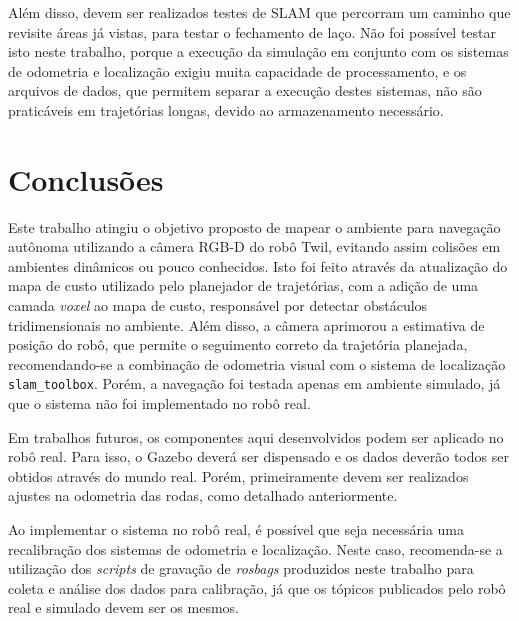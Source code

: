 \documentclass[repeatfields,xlists,xpacks,oneside,yearsonly]{ufrgscca}
\begin{document}
Além disso, devem ser realizados testes de SLAM que percorram um
caminho que revisite áreas já vistas, para testar o fechamento de
laço. Não foi possível testar isto neste trabalho, porque a execução
da simulação em conjunto com os sistemas de odometria e localização
exigiu muita capacidade de processamento, e os arquivos de dados, que
permitem separar a execução destes sistemas, não são praticáveis em
trajetórias longas, devido ao armazenamento necessário.

\chapter{Conclusões}
\label{conclusao}

Este trabalho atingiu o objetivo proposto de mapear o ambiente para
navegação autônoma utilizando a câmera RGB-D do robô Twil, evitando
assim colisões em ambientes dinâmicos ou pouco conhecidos. Isto foi
feito através da atualização do mapa de custo utilizado pelo
planejador de trajetórias, com a adição de uma camada \textit{voxel}
ao mapa de custo, responsável por detectar obstáculos tridimensionais
no ambiente. Além disso, a câmera aprimorou a estimativa de posição
do robô, que permite o seguimento correto da trajetória planejada,
recomendando-se a combinação de odometria visual com o sistema de
localização \texttt{slam\_toolbox}. Porém, a navegação foi testada
apenas em ambiente simulado, já que o sistema não foi implementado no
robô real.

Em trabalhos futuros, os componentes aqui desenvolvidos podem ser
aplicado no robô real. Para isso, o Gazebo deverá ser dispensado e os
dados deverão todos ser obtidos através do mundo real. Porém,
primeiramente devem ser realizados ajustes na odometria das rodas,
como detalhado anteriormente.

Ao implementar o sistema no robô real, é possível que seja necessária
uma recalibração dos sistemas de odometria e localização. Neste caso,
recomenda-se a utilização dos \textit{scripts} de gravação de
\textit{rosbags} produzidos neste trabalho para coleta e análise dos
dados para calibração, já que os tópicos publicados pelo robô real e
simulado devem ser os mesmos.

\printbibliography

%
%
%
\end{document}

